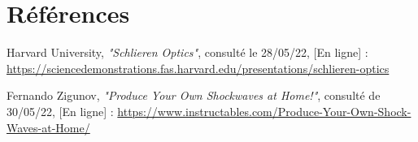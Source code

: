 \section*{Références}
\parindent0pt
\begin{enumerate}[label = {[\arabic*]}]
	\item Harvard University, \textit{"Schlieren Optics"}, consulté le 28/05/22, [En ligne] : \small\url{https://sciencedemonstrations.fas.harvard.edu/presentations/schlieren-optics}
	\label{ref:harvardedu}
	\item Fernando Zigunov, \textit{"Produce Your Own Shockwaves at Home!"}, consulté de 30/05/22, [En ligne] : \small\url{https://www.instructables.com/Produce-Your-Own-Shock-Waves-at-Home/}
	\label{ref:zigunov}
\end{enumerate}